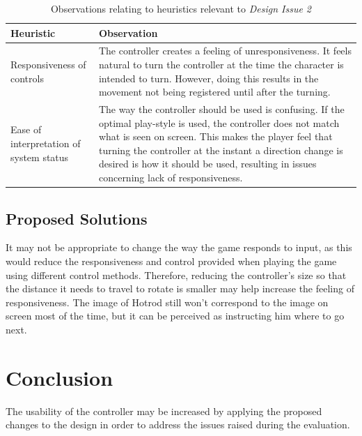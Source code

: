 \documentclass{scrartcl}
\begin{document}
\begin{table}
\centering
\begin{tabular}{| l | p{6cm} |}
\hline
\textbf{Heuristic} & \textbf{Observation} \\ \hline
Responsiveness of controls
 & The controller creates a feeling of unresponsiveness. It feels natural to turn the controller at the time the character is intended to turn. However, doing this results in the movement not being registered until after the turning. \\ \hline

Ease of interpretation of system status
 & The way the controller should be used is confusing. If the optimal play-style is used, the controller does not match what is seen on screen. This makes the player feel that turning the controller at the instant a direction change is desired is how it should be used, resulting in issues concerning lack of responsiveness. \\ \hline
\end{tabular}
\caption{Observations relating to heuristics relevant to \textit{Design Issue 2}}
\label{table:issue2}
\end{table}

\subsection{Proposed Solutions}
It may not be appropriate to change the way the game responds to input, as this would reduce the responsiveness and control provided when playing the game using different control methods. Therefore, reducing the controller's size so that the distance it needs to travel to rotate is smaller may help increase the feeling of responsiveness. The image of Hotrod still won't correspond to the image on screen most of the time, but it can be perceived as instructing him where to go next.

\section{Conclusion}
The usability of the controller may be increased by applying the proposed changes to the design in order to address the issues raised during the evaluation.



\end{document}
